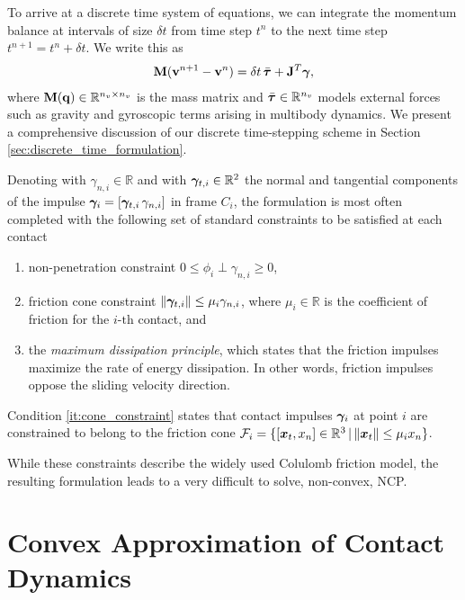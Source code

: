 To arrive at a discrete time system of equations, we can integrate the momentum
balance at intervals of size $\delta t$ from time step $t^n$ to the next time
step $t^{n+1}=t^n+\delta t$. We write this as
\begin{eqnarray}
	\mf{M}(\mf{v}^{n+1}-\mf{v}^n)  = \delta t\,\bar{\vf{\tau}} +
	\mf{J}^T\mf{\bgamma},
	\label{eq:momentum_balance}
\end{eqnarray}
where ${\mathbf{M}}({\mathbf{q}})\in\mathbb{R}^{n_v\times n_v}$ is the mass matrix and
$\bar{{\bm{\tau}}}\in\mathbb{R}^{n_v}$ models external forces such as gravity and
gyroscopic terms arising in multibody dynamics. We present a comprehensive
discussion of our discrete time-stepping scheme in Section
\ref{sec:discrete_time_formulation}.

Denoting with $\gamma_{n,i} \in \mathbb{R}$ and with ${\bm\gamma}_{t,i} \in
\mathbb{R}^2$ the normal and tangential components of the impulse
${\bm\gamma}_i=[{\bm\gamma}_{t,i}\,\gamma_{n,i}]$ in frame $C_i$, the formulation is
most often completed with the following set of standard constraints to be
satisfied at each contact
\begin{enumerate}
	\item non-penetration constraint $0\le\phi_i\perp\gamma_{n,i}\ge0$,
	\item\label{it:cone_constraint} friction cone constraint
	$\Vert{\bm\gamma}_{t,i}\Vert\le \mu_i\gamma_{n,i}$, where $\mu_i \in \mathbb{R}$
	is the coefficient of friction for the $i\text{-th}$ contact, and
	\item the \emph{maximum dissipation principle}, which states that the
	friction impulses maximize the rate of energy dissipation. In other words,
	friction impulses oppose the sliding velocity direction.
\end{enumerate}
Condition \ref{it:cone_constraint} states that contact impulses ${\bm\gamma}_i$ at
point $i$ are constrained to belong to the friction cone
$\mathcal{F}_i=\{[{\bm{x}}_t, x_n] \in\mathbb{R}^3 \,|\, \Vert{\bm{x}}_t\Vert\le
\mu_i x_n\}$.

While these constraints describe the widely used Colulomb friction model, the
resulting formulation leads to a very difficult to solve, non-convex, NCP.

\section{Convex Approximation of Contact Dynamics}
\label{sec:previous_work}

